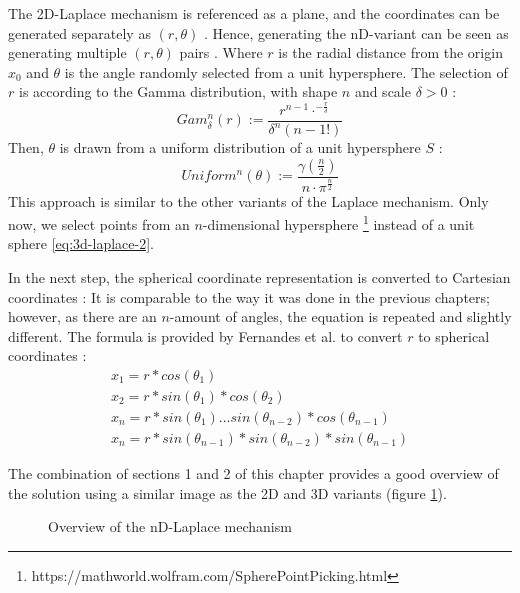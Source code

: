 The 2D-Laplace mechanism is referenced as a plane, and the coordinates can be generated separately as $(r, \theta)$ \citep{fernandes_generalised_2019,DBLP:journals/corr/abs-1212-1984}.
Hence, generating the nD-variant can be seen as generating multiple $(r, \theta)$ pairs \citep{fernandes_generalised_2019}.
Where $r$ is the radial distance from the origin $x_0$ and $\theta$ is the angle randomly selected from a unit hypersphere.
The selection of $r$ is according to the Gamma distribution, with shape $n$ and scale $\delta > 0$ \citep{fernandes_generalised_2019}:
\begin{equation}
  Gam^n_\delta(r) := \frac{r^{n-1}\cdot^{-\frac{r}{\delta}}}{\delta^n(n-1!)}
  \label{eq:generate_r_for_nd_laplace}
\end{equation}
Then, $\theta$ is drawn from a uniform distribution of a unit hypersphere $S$ \citep{fernandes_generalised_2019}:
\begin{equation}
  Uniform^n(\theta) := \frac{\gamma(\frac{n}{2})}{n \cdot \pi ^{\frac{n}{2}}}
  \label{eq:generate_theta_for_nd_laplace}
\end{equation}
This approach is similar to the other variants of the Laplace mechanism.
Only now, we select points from an $n$-dimensional hypersphere  \footnote{https://mathworld.wolfram.com/SpherePointPicking.html} instead of a unit sphere \ref{eq:3d-laplace-2}. \newline

In the next step, the spherical coordinate representation is converted to Cartesian coordinates \citep{fernandes_generalised_2019}:
It is comparable to the way it was done in the previous chapters; however, as there are an $n$-amount of angles, the equation is repeated and slightly different.
The formula is provided by Fernandes et al. to convert $r$ to spherical coordinates \citep{fernandes_generalised_2019}:
\begin{align}
  x_1 = r * cos (\theta_1)                                          \\
  x_2 = r * sin (\theta_1) * cos (\theta_2)                         \\
  x_{n} = r * sin(\theta_1) … sin(\theta_{n-2}) *cos (\theta_{n-1}) \\
  x_n = r * sin(\theta_{n-1}) * sin(\theta_{n-2}) * sin(\theta_{n-1})
  \label{eq:nd-laplace-cartesian}
\end{align}

The combination of sections 1 and 2 of this chapter provides a good overview of the solution using a similar image as the 2D and 3D variants (figure \ref{fig:nd-laplace-overview}).
\begin{figure}[H]
  
  \caption{Overview of the nD-Laplace mechanism}
  \label{fig:nd-laplace-overview}
\end{figure}

